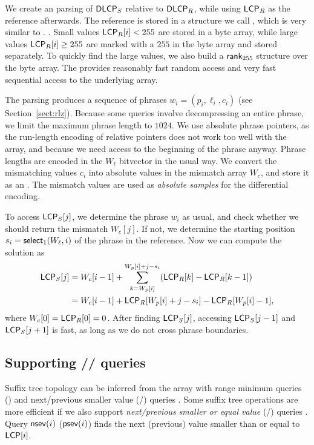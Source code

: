 We create an \RLZ{} parsing of $\mathsf{DLCP}_{S}$ relative to $\mathsf{DLCP}_{R}$, while
using $\mathsf{LCP}_{R}$ as the reference afterwards. The reference is stored in a
structure we call \slarray, which is very similar to \LCPbyte.
\cite{Abouelhoda2004}. Small values $\mathsf{LCP}_{R}[i] < 255$ are stored in a byte
array, while large values $\mathsf{LCP}_{R}[i] \ge 255$ are marked with a $255$ in the
byte array and stored separately. To quickly find the large values, we also
build a $\mathsf{rank}_{255}$ structure over the byte array. The \slarray{} provides
reasonably fast random access and very fast sequential access to the
underlying array.

The \RLZ{} parsing produces a sequence of phrases $w_{i} = (p_{i}, \ell_{i},
c_{i})$ (see Section~\ref{sect:rlz}). Because some queries involve
decompressing an entire phrase, we limit the maximum phrase length to $1024$.
We use absolute phrase pointers, as the run-length encoding of relative
pointers does not work too well with the \DLCP{} array, and because we need
access to the beginning of the phrase anyway. Phrase lengths are encoded in
the $W_{\ell}$ bitvector in the usual way. We convert the mismatching \DLCP{}
values $c_{i}$ into absolute \LCP{} values in the mismatch array $W_{c}$, and
store it as an \slarray. The mismatch values are used as \emph{absolute
samples} for the differential encoding.

To access $\mathsf{LCP}_{S}[j]$, we determine the phrase $w_{i}$ as usual, and check
whether we should return the mismatch $W_{c}[j]$. If not, we determine the
starting position $s_{i} = \mathsf{select}_{1}(W_{\ell}, i)$ of the phrase in the
reference. Now we can compute the solution as
\begin{align*}
\mathsf{LCP}_{S}[j] &= W_{c}[i-1] + \sum_{k = W_{p}[i]}^{W_{p}[i]+j-s_{i}}
(\mathsf{LCP}_{R}[k] - \mathsf{LCP}_{R}[k-1]) \\
&= W_{c}[i-1] + \mathsf{LCP}_{R}[W_{p}[i]+j-s_{i}] - \mathsf{LCP}_{R}[W_{p}[i]-1],
\end{align*}
where $W_{c}[0] = \mathsf{LCP}_{R}[0] = 0$. After finding $\mathsf{LCP}_{S}[j]$, accessing
$\mathsf{LCP}_{S}[j-1]$ and $\mathsf{LCP}_{S}[j+1]$ is fast, as long as we do not cross phrase
boundaries.

\subsection{Supporting \nsv/\psv/\rmq{} queries}

Suffix tree topology can be inferred from the \LCP{} array with range minimum
queries (\rmq) and next/previous smaller value (\nsv/\psv) queries
\cite{Fischer2009a}. Some suffix tree operations are more efficient
if we also support \emph{next/previous smaller or equal value} (\nsev/\psev)
queries \cite{Abeliuk2013}. Query $\mathsf{nsev}(i)$ ($\mathsf{psev}(i)$) finds the next
(previous) value smaller than or equal to $\mathsf{LCP}[i]$.


